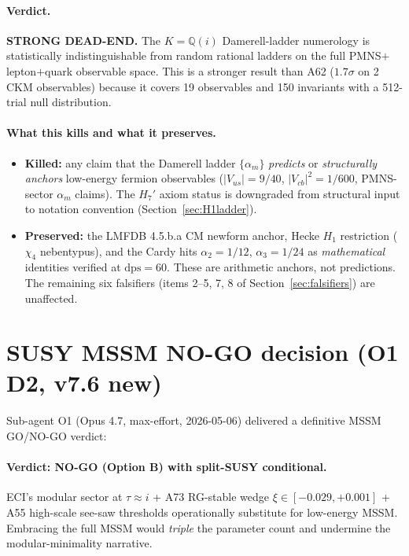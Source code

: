 \documentclass[a4paper,11pt]{article}
\newcommand{\Qi}{\mathbb{Q}(i)}
\theoremstyle{definition}
\theoremstyle{remark}
\begin{document}
\paragraph{Verdict.}
\textbf{STRONG DEAD-END.}  The $K=\Qi$ Damerell-ladder numerology
is statistically indistinguishable from random rational ladders
on the full PMNS$+$lepton$+$quark observable space.
This is a stronger result than A62 ($1.7\sigma$ on 2 CKM
observables) because it covers 19 observables and 150
invariants with a 512-trial null distribution.

\paragraph{What this kills and what it preserves.}
\begin{itemize}
  \item \textbf{Killed:} any claim that the Damerell ladder
    $\{\alpha_m\}$ \emph{predicts} or \emph{structurally anchors}
    low-energy fermion observables ($|V_{us}|=9/40$,
    $|V_{cb}|^2=1/600$, PMNS-sector $\alpha_m$ claims).
    The $H_7'$ axiom status is downgraded from structural input
    to notation convention (Section~\ref{sec:H1ladder}).
  \item \textbf{Preserved:} the LMFDB 4.5.b.a CM newform
    anchor, Hecke $H_1$ restriction ($\chi_4$ nebentypus), and
    the Cardy hits $\alpha_2=1/12$, $\alpha_3=1/24$ as
    \emph{mathematical} identities verified at $\mathrm{dps}=60$.
    These are arithmetic anchors, not predictions.
    The remaining six falsifiers (items 2--5, 7, 8 of
    Section~\ref{sec:falsifiers}) are unaffected.
\end{itemize}

\section{SUSY MSSM NO-GO decision (O1 D2, v7.6 new)}
\label{sec:susy-nogo}

Sub-agent O1 (Opus 4.7, max-effort, 2026-05-06) delivered a
definitive MSSM GO/NO-GO verdict:

\paragraph{Verdict: NO-GO (Option B) with split-SUSY conditional.}
ECI's modular sector at $\tau\approx i$ + A73 RG-stable wedge
$\xi\in[-0.029,+0.001]$ + A55 high-scale see-saw thresholds
operationally substitute for low-energy MSSM.  Embracing the
full MSSM would \emph{triple} the parameter count and undermine
the modular-minimality narrative.
\end{document}
